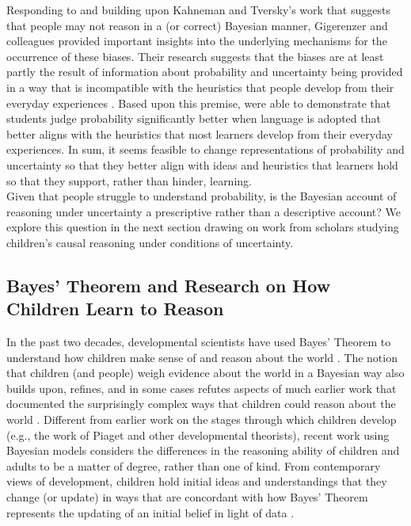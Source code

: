 \documentclass[man, floatsintext]{apa7} %
\begin{document}
Responding to and building upon Kahneman and Tversky's work that suggests that people may not reason in a  (or correct) Bayesian manner, Gigerenzer and colleagues provided important insights into the underlying mechanisms for the occurrence of these biases. Their research suggests that the biases are at least partly the result of information about probability and uncertainty being provided in a way that is incompatible with the heuristics that people develop from their everyday experiences \parencite{gh95, jkg18}. Based upon this premise, \textcite{jkg18} were able to demonstrate that students judge probability significantly better when language is adopted that better aligns with the heuristics that most learners develop from their everyday experiences. In sum, it seems feasible to change representations of probability and uncertainty so that they better align with ideas and heuristics that learners hold so that they support, rather than hinder, learning. \\

Given that people struggle to understand probability, is the Bayesian account of reasoning under uncertainty a prescriptive rather than a descriptive account? We explore this question in the next section drawing on work from scholars studying children's causal reasoning under conditions of uncertainty. \\

\subsection{Bayes' Theorem and Research on How Children Learn to Reason}

In the past two decades, developmental scientists have used Bayes' Theorem to understand how children make sense of and reason about the world \parencite{g12, tgk06, tgk06, bonawitz_sticking_2019}. The notion that children (and people) weigh evidence about the world in a Bayesian way also builds upon, refines, and in some cases refutes aspects of much earlier work that documented the surprisingly complex ways that children could reason about the world \parencite{pi69}. Different from earlier work on the stages through which children develop (e.g., the work of Piaget and other developmental  theorists), recent work using Bayesian models considers the differences in the reasoning ability of children and adults to be a matter of degree, rather than one of kind. From contemporary views of development, children hold initial ideas and understandings that they change (or update) in ways that are concordant with how Bayes' Theorem represents the updating of an initial belief in light of data \parencite{g12}. \\
\end{document}
